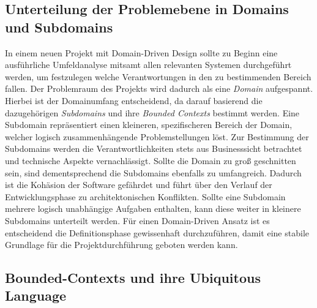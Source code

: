 \subsection{Unterteilung der Problemebene in Domains und Subdomains}

In einem neuen Projekt mit Domain-Driven Design sollte zu Beginn eine ausführliche Umfeldanalyse mitsamt allen relevanten Systemen durchgeführt werden, um festzulegen welche Verantwortungen in den zu bestimmenden Bereich fallen. Der Problemraum des Projekts wird dadurch als eine \emph{Domain} aufgespannt. Hierbei ist der Domainumfang entscheidend, da darauf basierend die dazugehörigen \emph{Subdomains} und ihre \emph{Bounded Contexts} bestimmt werden. Eine Subdomain repräsentiert einen kleineren, spezifischeren Bereich der Domain, welcher logisch zusammenhängende Problemstellungen löst. Zur Bestimmung der Subdomains werden die Verantwortlichkeiten stets aus Businesssicht betrachtet und technische Aspekte vernachlässigt. Sollte die Domain zu groß geschnitten sein, sind dementsprechend die Subdomains ebenfalls zu umfangreich. Dadurch ist die Kohäsion der Software gefährdet und führt über den Verlauf der Entwicklungsphase zu architektonischen Konflikten. Sollte eine Subdomain mehrere logisch unabhängige Aufgaben enthalten, kann diese weiter in kleinere Subdomains unterteilt werden. Für einen Domain-Driven Ansatz ist es entscheidend die Definitionsphase gewissenhaft durchzuführen, damit eine stabile Grundlage für die Projektdurchführung geboten werden kann. 

\subsection{Bounded-Contexts und ihre Ubiquitous Language}

